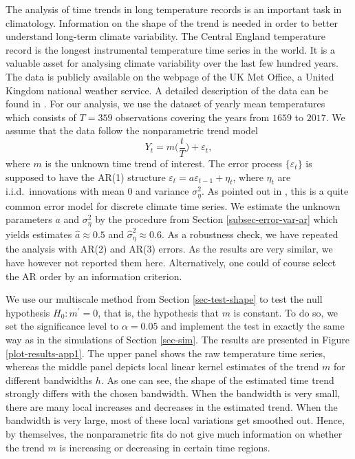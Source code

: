 The analysis of time trends in long temperature records is an important task in climatology. Information on the shape of the trend is needed in order to better understand long-term climate variability. The Central England temperature record is the longest instrumental temperature time series in the world. It is a valuable asset for analysing climate variability over the last few hundred years. The data is publicly available on the webpage of the UK Met Office, a United Kingdom national weather service. A detailed description of the data can be found in \cite{Parker1992}. For our analysis, we use the dataset of yearly mean temperatures which consists of $T=359$ observations covering the years from $1659$ to $2017$. We assume that the data follow the nonparametric trend model 
\[ Y_t = m\Big(\frac{t}{T}\Big) + \varepsilon_t, \]
where $m$ is the unknown time trend of interest. The error process $\{ \varepsilon_t \}$ is supposed to have the AR(1) structure $\varepsilon_t = a \varepsilon_{t-1} + \eta_t$, where $\eta_t$ are i.i.d.\ innovations with mean $0$ and variance $\sigma_\eta^2$. As pointed out in \cite{Mudelsee2010}, this is a quite common error model for discrete climate time series. We estimate the unknown parameters $a$ and $\sigma_\eta^2$ by the procedure from Section \ref{subsec-error-var-ar} which yields estimates $\widehat{a} \approx 0.5$ and $\widehat{\sigma}_\eta^2 \approx 0.6$. As a robustness check, we have repeated the analysis with AR(2) and AR(3) errors. As the results are very similar, we have however not reported them here. Alternatively, one could of course select the AR order by an information criterion.   


We use our multiscale method from Section \ref{sec-test-shape} to test the null hypothesis $H_0: m^\prime = 0$, that is, the hypothesis that $m$ is constant. To do so, we set the significance level to $\alpha = 0.05$ and implement the test in exactly the same way as in the simulations of Section \ref{sec-sim}. The results are presented in Figure \ref{plot-results-app1}. The upper panel shows the raw temperature time series, whereas the middle panel depicts local linear kernel estimates of the trend $m$ for different bandwidths $h$. As one can see, the shape of the estimated time trend strongly differs with the chosen bandwidth. When the bandwidth is very small, there are many local increases and decreases in the estimated trend. When the bandwidth is very large, most of these local variations get smoothed out. Hence, by themselves, the nonparametric fits do not give much information on whether the trend $m$ is increasing or decreasing in certain time regions. 


